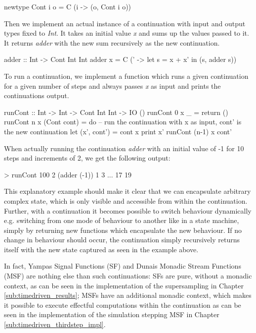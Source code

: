 \begin{HaskellCode}
newtype Cont i o = C (i -> (o, Cont i o))
\end{HaskellCode}

Then we implement an actual instance of a continuation with input and output types fixed to \textit{Int}. It takes an initial value \textit{x} and sums up the values passed to it. It returns \textit{adder} with the new sum recursively as the new continuation.

\begin{HaskellCode}
adder :: Int -> Cont Int Int
adder x = C (\x' -> let s = x + x' in
                    (s, adder s))
\end{HaskellCode}

To run a continuation, we implement a function which runs a given continuation for a given number of steps and always passes \textit{x} as input and prints the continuations output.

\begin{HaskellCode}
runCont :: Int -> Int -> Cont Int Int -> IO ()
runCont 0 x _ = return () 
runCont n x (Cont cont) = do 
  -- run the continuation with x as input, cont' is the new continuation
  let (x', cont') = cont x
  print x'
  runCont (n-1) x cont' 
\end{HaskellCode}

When actually running the continuation \textit{adder} with an initial value of -1 for 10 steps and increments of 2, we get the following output:

\begin{HaskellCode}
> runCont 100 2 (adder (-1))
1
3
...
17
19
\end{HaskellCode}

This explanatory example should make it clear that we can encapsulate arbitrary complex state, which is only visible and accessible from within the continuation. Further, with a continuation it becomes possible to switch behaviour dynamically e.g. switching from one mode of behaviour to another like in a state machine, simply by returning new functions which encapsulate the new behaviour. If no change in behaviour should occur, the continuation simply recursively returns itself with the new state captured as seen in the example above.

In fact, Yampas Signal Functions (SF) and Dunais Monadic Stream Functions (MSF) are nothing else than such continuations: SFs are pure, without a monadic context, as can be seen in the implementation of the supersampling in Chapter \ref{sub:timedriven_results}; MSFs have an additional monadic context, which makes it possible to execute effectful computations within the continuation as can be seen in the implementation of the simulation stepping MSF in Chapter \ref{sub:timedriven_thirdstep_impl}. 

